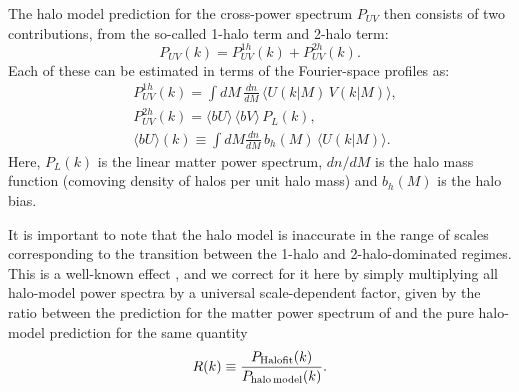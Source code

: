 \documentclass[useAMS,usenatbib]{mn2e}
\begin{document}
    The halo model prediction for the cross-power spectrum $P_{UV}$ then consists of two contributions, from the so-called 1-halo term and 2-halo term:
    \begin{equation}
      P_{UV}(k)=P^{1h}_{UV}(k)+P^{2h}_{UV}(k).
    \end{equation}
    Each of these can be estimated in terms of the Fourier-space profiles as:
    \begin{align}
      &P^{1h}_{UV}(k)=\int dM\,\frac{dn}{dM}\,\langle U(k|M)\,V(k|M)\rangle,\\
      &P^{2h}_{UV}(k)=\langle bU\rangle\,\langle bV\rangle\,P_L(k),\\
      &\langle bU\rangle(k)\equiv\int dM\frac{dn}{dM}\,b_h(M)\,\langle U(k|M)\rangle. \label{eq:hm_bias}
    \end{align}
    Here, $P_L(k)$ is the linear matter power spectrum, $dn/dM$ is the halo mass function (comoving density of halos per unit halo mass) and $b_h(M)$ is the halo bias.

    It is important to note that the halo model is inaccurate in the range of scales corresponding to the transition between the 1-halo and 2-halo-dominated regimes. This is a well-known effect \citep{2015MNRAS.454.1958M}, and we correct for it here by simply multiplying all halo-model power spectra by a universal scale-dependent factor, given by the ratio between the prediction for the matter power spectrum of \cite{2012ApJ...761..152T} and the pure halo-model prediction for the same quantity
    \begin{equation}
      R(k)\equiv\frac{P_{\rm Halofit}(k)}{P_{\rm halo\,model}(k)}.
    \end{equation}
    
\end{document}
